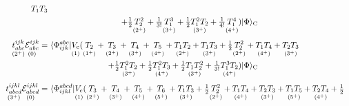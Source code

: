 \documentclass[11pt]{article}
\numberwithin{equation}{section}
\begin{document}
\begin{rmk}
\begin{align}
{      T_1T_3
    }
\\
\label{eq:cc-doubles-equation}
&
\makebox[0.75\linewidth][r]{\ensuremath{
    +
      \tfr{1}{2}
    \underset{(2^{+})}{\vphantom{(}
      T_2^2
    }
    +
      \tfr{1}{3!}
    \underset{(3^{+})}{\vphantom{(}
      T_1^3
    }
    +
      \tfr{1}{2}
    \underset{(3^{+})}{\vphantom{(}
      T_1^2T_2
    }
    +
      \tfr{1}{4!}
    \underset{(4^{+})}{\vphantom{(}
      T_1^4
    }
    )
  \kt{\F}_\mr{C}
}}
\\[3pt]
\nonumber
  \underset{(2^+)}{\vphantom{(}
  t_{abc}^{ijk}
  }
  \underset{(0)}{\vphantom{(}
  \mc{E}_{abc}^{ijk}
  }
=&\
  \br{\F_{ijk}^{abc}}
  \underset{(1)}{\vphantom{(}
    V_\mr{c}
  }
    (
    \underset{(1^{+})}{\vphantom{(}
      T_2
    }
    +
    \underset{(2^{+})}{\vphantom{(}
      T_3
    }
    +
    \underset{(3^{+})}{\vphantom{(}
      T_4
    }
    +
    \underset{(4^{+})}{\vphantom{(}
      T_5
    }
    +
    \underset{(2^{+})}{\vphantom{(}
      T_1T_2
    }
    +
    \underset{(3^{+})}{\vphantom{(}
      T_1T_3
    }
    +
      \tfr{1}{2}
    \underset{(2^{+})}{\vphantom{(}
      T_2^2
    }
    +
    \underset{(4^{+})}{\vphantom{(}
      T_1T_4
    }
    +
    \underset{(3^{+})}{\vphantom{(}
      T_2T_3
    }
\\
\label{eq:cc-triples-equation}
&
\makebox[0.75\linewidth][r]{\ensuremath{
    +
      \tfr{1}{2}
    \underset{(3^{+})}{\vphantom{(}
      T_1^2T_2
    }
    +
      \tfr{1}{2}
    \underset{(4^{+})}{\vphantom{(}
      T_1^2T_3
    }
    +
      \tfr{1}{2}
    \underset{(3^{+})}{\vphantom{(}
      T_1T_2^2
    }
    +
      \tfr{1}{3!}
    \underset{(4^{+})}{\vphantom{(}
      T_1^3T_2
    }
    )
  \kt{\F}_\mr{C}
}}
\\[3pt]
\nonumber
  \underset{(3^+)}{\vphantom{(}
  t_{abcd}^{ijkl}
  }
  \underset{(0)}{\vphantom{(}
  \mc{E}_{abcd}^{ijkl}
  }
=&\
  \br{\F_{ijkl}^{abcd}}
  \underset{(1)}{\vphantom{(}
    V_\mr{c}
  }
    (
    \underset{(2^{+})}{\vphantom{(}
      T_3
    }
    +
    \underset{(3^{+})}{\vphantom{(}
      T_4
    }
    +
    \underset{(4^{+})}{\vphantom{(}
      T_5
    }
    +
    \underset{(5^{+})}{\vphantom{(}
      T_6
    }
    +
    \underset{(3^{+})}{\vphantom{(}
      T_1T_3
    }
    +
      \tfr{1}{2}
    \underset{(2^{+})}{\vphantom{(}
      T_2^2
    }
    +
    \underset{(4^{+})}{\vphantom{(}
      T_1T_4
    }
    +
    \underset{(3^{+})}{\vphantom{(}
      T_2T_3
    }
    +
    \underset{(5^{+})}{\vphantom{(}
      T_1T_5
    }
    +
    \underset{(4^{+})}{\vphantom{(}
      T_2T_4
    }
    +
      \tfr{1}{2}

\end{align}
\end{rmk}
\end{document}
